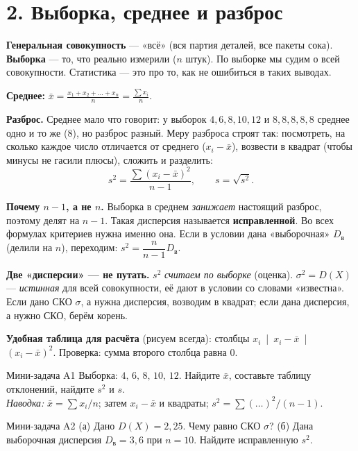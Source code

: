 \documentclass[a4paper,11pt]{extarticle}
\begin{document}
\section*{2. Выборка, среднее и разброс}
\textbf{Генеральная совокупность} --- «всё» (вся партия деталей, все пакеты сока). \textbf{Выборка} --- то, что реально измерили ($n$ штук). По выборке мы судим о всей совокупности. Статистика --- это про то, как не ошибиться в таких выводах.

\textbf{Среднее:} $\displaystyle\bar x=\frac{x_1+x_2+\dots+x_n}{n}=\frac{\sum x_i}{n}$.

\textbf{Разброс.} Среднее мало что говорит: у выборок $4,6,8,10,12$ и $8,8,8,8,8$ среднее одно и то же (8), но разброс разный. Меру разброса строят так: посмотреть, на сколько каждое число отличается от среднего ($x_i-\bar x$), возвести в квадрат (чтобы минусы не гасили плюсы), сложить и разделить:
$$s^2=\frac{\sum(x_i-\bar x)^2}{n-1},\qquad s=\sqrt{s^2}.$$

\begin{warn}
\textbf{Почему $n-1$, а не $n$.} Выборка в среднем \emph{занижает} настоящий разброс, поэтому делят на $n-1$. Такая дисперсия называется \textbf{исправленной}. Во всех формулах критериев нужна именно она. Если в условии дана «выборочная» $D_{\text{в}}$ (делили на $n$), переходим: $s^2=\dfrac{n}{n-1}D_{\text{в}}$.
\end{warn}
\begin{warn}
\textbf{Две «дисперсии» --- не путать.} $s^2$ \emph{считаем по выборке} (оценка). $\sigma^2=D(X)$ --- \emph{истинная} для всей совокупности, её дают в условии со словами «известна». Если дано СКО $\sigma$, а нужна дисперсия, возводим в квадрат; если дана дисперсия, а нужно СКО, берём корень.
\end{warn}
\textbf{Удобная таблица для расчёта} (рисуем всегда): столбцы $x_i$ \,|\, $x_i-\bar x$ \,|\, $(x_i-\bar x)^2$. Проверка: сумма второго столбца равна 0.

\begin{task}{Мини-задача A1}
Выборка: $4,\,6,\,8,\,10,\,12$. Найдите $\bar x$, составьте таблицу отклонений, найдите $s^2$ и $s$.\\
\emph{Наводка:} $\bar x=\sum x_i/n$; затем $x_i-\bar x$ и квадраты; $s^2=\sum(\dots)^2/(n-1)$.
\end{task}
\begin{task}{Мини-задача A2}
(а) Дано $D(X)=2{,}25$. Чему равно СКО $\sigma$? \quad (б) Дана выборочная дисперсия $D_{\text{в}}=3{,}6$ при $n=10$. Найдите исправленную $s^2$.
\end{task}
\end{document}
